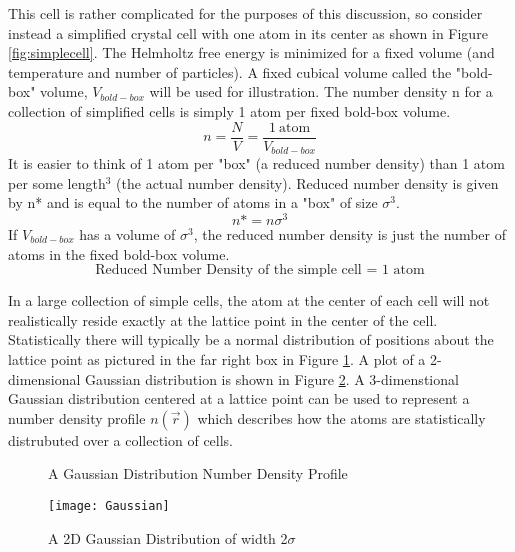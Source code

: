 \documentclass[12pt]{article}
\begin{document}
This cell is rather complicated for the purposes of this discussion, so consider instead a simplified crystal cell with one atom in its center as shown in Figure \ref{fig:simplecell}. 
The Helmholtz free energy is minimized for a fixed volume (and temperature and number of particles).  A fixed cubical volume called the "bold-box" volume, $V_{bold-box}$ will be used for illustration. The number density n for a collection of simplified cells is simply 1 atom per fixed bold-box volume.
\begin{displaymath}{n = \frac{N}{V}=\frac{1~\text{atom}}{V_{bold-box}}}\end{displaymath} It is easier to think of 1 atom per "box" (a reduced number density) than 1 atom per some length$^3$ (the actual number density). Reduced number density is given by n* and is equal to the number of atoms in a "box" of size $\sigma^3$.
\begin{displaymath}{n*=n\sigma^3}\end{displaymath} If $V_{bold-box}$  has a volume of $\sigma^3$, the reduced number density is just the number of atoms in the fixed bold-box volume. 
\begin{displaymath}\text{Reduced Number Density of the simple cell = 1 atom}\end{displaymath} 

In a large collection of simple cells, the atom at the center of each cell will not realistically reside exactly at the lattice point in the center of the cell. Statistically there will typically be a normal distribution of positions about the lattice point as pictured in the far right box in Figure \ref{fig:Ensemble_Gaus}. A plot of a 2-dimensional Gaussian distribution is shown in Figure \ref{fig:Gaus_plot}. A 3-dimenstional Gaussian distribution centered at a lattice point can be used to represent a number density profile $n(\vec{r})$  which describes how the atoms are statistically distrubuted over a collection of cells.

  \begin{figure}[h!]
    \centering
    \caption{A Gaussian Distribution Number Density Profile}
    \label{fig:Ensemble_Gaus}
  \end{figure} 


 \begin{figure}[h!]
    \centering
    \texttt{[image: Gaussian]}
    \caption{A 2D Gaussian Distribution of width 2$\sigma$}
    \label{fig:Gaus_plot}
  \end{figure}  
\end{document}
